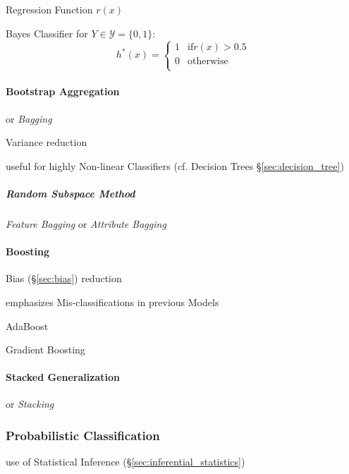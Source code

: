 Regression Function $r(x)$

Bayes Classifier for $Y \in \mathcal{Y} = \{0, 1\}$:
\[
  h^*(x) = \begin{cases}
    1 & \text{if} r(x) > 0.5 \\
    0 & \text{otherwise} \\
  \end{cases}
\]



\paragraph{Bootstrap Aggregation}\label{sec:bootstrap_aggregation}\hfill

or \emph{Bagging}

Variance reduction

useful for highly Non-linear Classifiers (cf. Decision Trees
\S\ref{sec:decision_tree})



\subparagraph{Random Subspace Method}\label{sec:random_subspace_method}\hfill

\emph{Feature Bagging} or \emph{Attribute Bagging}



\paragraph{Boosting}\label{sec:boosting}\hfill

Bias (\S\ref{sec:bias}) reduction

emphasizes Mis-classifications in previous Models

AdaBoost

Gradient Boosting



\paragraph{Stacked Generalization}\label{sec:stacked_generalization}\hfill

or \emph{Stacking}



\subsubsection{Probabilistic Classification}
\label{sec:probabilistic_classification}

use of Statistical Inference (\S\ref{sec:inferential_statistics})



